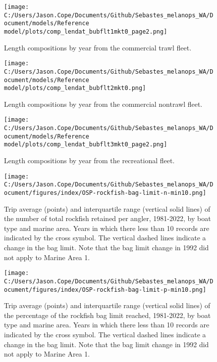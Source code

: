 \documentclass[11pt,
  letterpaper,
]{article}
\begin{document}
\pagebreak

\begin{figure}
{\centering
\texttt{[image: C:/Users/Jason.Cope/Documents/Github/Sebastes\_melanops\_WA/Document/models/Reference model/plots/comp\_lendat\_bubflt1mkt0\_page2.png]}
}
\caption{Length compositions by year from the commercial trawl fleet.\label{fig:trawl-length-comps}}
\end{figure}

\pagebreak

\begin{figure}
{\centering
\texttt{[image: C:/Users/Jason.Cope/Documents/Github/Sebastes\_melanops\_WA/Document/models/Reference model/plots/comp\_lendat\_bubflt2mkt0.png]}
}
\caption{Length compositions by year from the commercial nontrawl fleet.\label{fig:nontrawl-length-comps}}
\end{figure}

\pagebreak

\begin{figure}
{\centering
\texttt{[image: C:/Users/Jason.Cope/Documents/Github/Sebastes\_melanops\_WA/Document/models/Reference model/plots/comp\_lendat\_bubflt3mkt0\_page2.png]}
}
\caption{Length compositions by year from the recreational fleet.\label{fig:rec-length-comps}}
\end{figure}

\pagebreak

\begin{figure}
{\centering
\texttt{[image: C:/Users/Jason.Cope/Documents/Github/Sebastes\_melanops\_WA/Document/figures/index/OSP-rockfish-bag-limit-n-min10.png]}
}
\caption{Trip average (points) and interquartile range (vertical solid lines) of the number of total rockfish retained per angler, 1981-2022, by boat type and marine area. Years in which there less than 10 records are indicated by the cross symbol. The vertical dashed lines indicate a change in the bag limit. Note that the bag limit change in 1992 did not apply to Marine Area 1.\label{fig:baglimit_numbers}}
\end{figure}

\pagebreak

\begin{figure}
{\centering
\texttt{[image: C:/Users/Jason.Cope/Documents/Github/Sebastes\_melanops\_WA/Document/figures/index/OSP-rockfish-bag-limit-p-min10.png]}
}
\caption{Trip average (points) and interquartile range (vertical solid lines) of the percentage of the rockfish bag limit reached, 1981-2022, by boat type and marine area. Years in which there less than 10 records are indicated by the cross symbol. The vertical dashed lines indicate a change in the bag limit. Note that the bag limit change in 1992 did not apply to Marine Area 1.\label{fig:baglimit_percentage}}
\end{figure}
\end{document}
